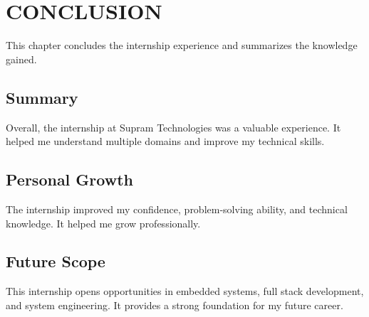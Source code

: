 \documentclass[12pt,a4paper]{report}
\begin{document}
\chapter{CONCLUSION}


This chapter concludes the internship experience and summarizes the knowledge gained.




\section{Summary}

Overall, the internship at Supram Technologies was a valuable experience. It helped me understand multiple domains and improve my technical skills.


\section{Personal Growth}

The internship improved my confidence, problem-solving ability, and technical knowledge. It helped me grow professionally.


\section{Future Scope}

This internship opens opportunities in embedded systems, full stack development, and system engineering. It provides a strong foundation for my future career.
\end{document}
